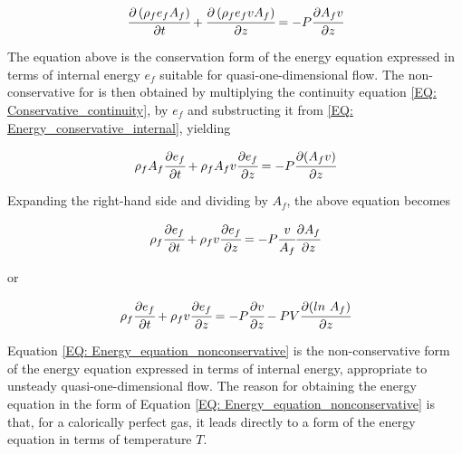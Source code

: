 \documentclass[../Article_Design_of_Experiment.tex]{subfiles}
\begin{document}
	{\footnotesize
		\begin{equation}
			\cfrac{\partial \left( \rho_f e_f A_f \right) }{\partial t} + \cfrac{\partial \left( \rho_f  e_f v A_f \right)}{\partial z} = -P \cfrac{\partial A_f v}{\partial z}
			\label{EQ: Energy_conservative_internal}
		\end{equation}
	}
	
	The equation above is the conservation form of the energy equation expressed in terms of internal energy $e_f$ suitable for quasi-one-dimensional flow. The non-conservative for is then obtained by multiplying the continuity equation \ref{EQ: Conservative_continuity}, by $e_f$ and substructing it from \ref{EQ: Energy_conservative_internal}, yielding 
	
	{\footnotesize
		\begin{equation}
			\rho_f A_f \cfrac{\partial e_f}{\partial t} + \rho_f A_f v \cfrac{\partial e_f}{\partial z} = - P \cfrac{\partial (A_f v) }{\partial z}
		\end{equation}
	}
	
	Expanding the right-hand side and dividing by $A_f$, the above equation becomes 
	
	{\footnotesize
		\begin{equation}
			\rho_f \cfrac{\partial e_f}{\partial t} + \rho_f v \cfrac{\partial e_f}{\partial z} = -P \cfrac{v}{A_f} \cfrac{\partial A_f}{\partial z}
		\end{equation}
	}

	or
	
	{\footnotesize
		\begin{equation}
			\rho_f \cfrac{\partial e_f}{\partial t} + \rho_f v \cfrac{\partial e_f}{\partial z} = -P \cfrac{\partial v}{\partial z} - P V \cfrac{\partial (ln~A_f)}{\partial z}
			\label{EQ: Energy_equation_nonconservative}
		\end{equation}
	}
	
	Equation \ref{EQ: Energy_equation_nonconservative} is the non-conservative form of the energy equation expressed in terms of internal energy, appropriate to unsteady quasi-one-dimensional flow. The reason for obtaining the energy equation in the form of Equation \ref{EQ: Energy_equation_nonconservative} is that, for a calorically perfect gas, it leads directly to a form of the energy equation in terms of temperature $T$. 
%	
%	
%	
	
	
	
	
	
	
	
	
	
	
	
	
	
	
	
\end{document}
